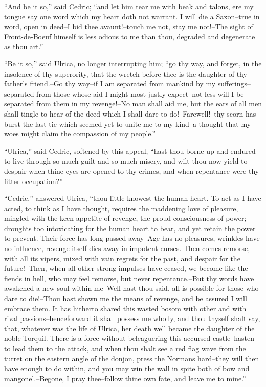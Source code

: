 ``And be it so,'' said Cedric; ``and let him tear me with beak and
talons, ere my tongue say one word which my heart doth not warrant. I
will die a Saxon--true in word, open in deed--I bid thee avaunt!--touch
me not, stay me not!--The sight of Front-de-Boeuf himself is less odious
to me than thou, degraded and degenerate as thou art.''

``Be it so,'' said Ulrica, no longer interrupting him; ``go thy way, and
forget, in the insolence of thy superority, that the wretch before thee
is the daughter of thy father's friend.--Go thy way--if I am separated
from mankind by my sufferings--separated from those whose aid I might
most justly expect--not less will I be separated from them in my
revenge!--No man shall aid me, but the ears of all men shall tingle to
hear of the deed which I shall dare to do!--Farewell!--thy scorn has
burst the last tie which seemed yet to unite me to my kind--a thought
that my woes might claim the compassion of my people.''

``Ulrica,'' said Cedric, softened by this appeal, ``hast thou borne up
and endured to live through so much guilt and so much misery, and wilt
thou now yield to despair when thine eyes are opened to thy crimes, and
when repentance were thy fitter occupation?''

``Cedric,'' answered Ulrica, ``thou little knowest the human heart. To
act as I have acted, to think as I have thought, requires the maddening
love of pleasure, mingled with the keen appetite of revenge, the proud
consciousness of power; droughts too intoxicating for the human heart to
bear, and yet retain the power to prevent. Their force has long passed
away--Age has no pleasures, wrinkles have no influence, revenge itself
dies away in impotent curses. Then comes remorse, with all its vipers,
mixed with vain regrets for the past, and despair for the future!--Then,
when all other strong impulses have ceased, we become like the fiends in
hell, who may feel remorse, but never repentance.--But thy words have
awakened a new soul within me--Well hast thou said, all is possible for
those who dare to die!--Thou hast shown me the means of revenge, and be
assured I will embrace them. It has hitherto shared this wasted bosom
with other and with rival passions--henceforward it shall possess me
wholly, and thou thyself shalt say, that, whatever was the life of
Ulrica, her death well became the daughter of the noble Torquil. There
is a force without beleaguering this accursed castle--hasten to lead
them to the attack, and when thou shalt see a red flag wave from the
turret on the eastern angle of the donjon, press the Normans hard--they
will then have enough to do within, and you may win the wall in spite
both of bow and mangonel.--Begone, I pray thee--follow thine own fate,
and leave me to mine.''

